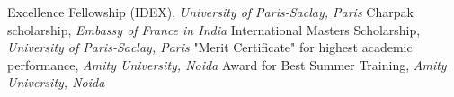 %
%
%


\begin{scholarship}
					{Excellence Fellowship (IDEX), \textit{University of Paris-Saclay, Paris}}
					{{Charpak scholarship}, \textit{Embassy of France in India}}
					{International Master\textquotesingle s Scholarship, \textit{University of Paris-Saclay, Paris}}
					{"Merit Certificate" for highest academic performance, \textit{Amity University, Noida}}
					{Award for Best Summer Training, \textit{Amity University, Noida}}
\end{scholarship}